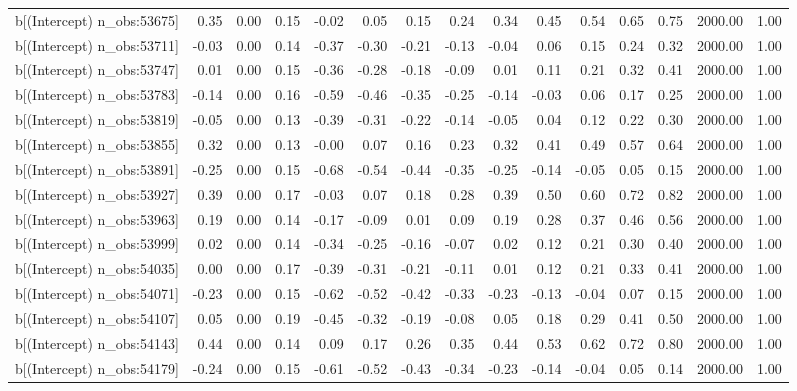 \begin{table}[ht]
\begin{tabular}{rrrrrrrrrrrrrrr}
  b[(Intercept) n\_obs:53675] & 0.35 & 0.00 & 0.15 & -0.02 & 0.05 & 0.15 & 0.24 & 0.34 & 0.45 & 0.54 & 0.65 & 0.75 & 2000.00 & 1.00 \\ 
  b[(Intercept) n\_obs:53711] & -0.03 & 0.00 & 0.14 & -0.37 & -0.30 & -0.21 & -0.13 & -0.04 & 0.06 & 0.15 & 0.24 & 0.32 & 2000.00 & 1.00 \\ 
  b[(Intercept) n\_obs:53747] & 0.01 & 0.00 & 0.15 & -0.36 & -0.28 & -0.18 & -0.09 & 0.01 & 0.11 & 0.21 & 0.32 & 0.41 & 2000.00 & 1.00 \\ 
  b[(Intercept) n\_obs:53783] & -0.14 & 0.00 & 0.16 & -0.59 & -0.46 & -0.35 & -0.25 & -0.14 & -0.03 & 0.06 & 0.17 & 0.25 & 2000.00 & 1.00 \\ 
  b[(Intercept) n\_obs:53819] & -0.05 & 0.00 & 0.13 & -0.39 & -0.31 & -0.22 & -0.14 & -0.05 & 0.04 & 0.12 & 0.22 & 0.30 & 2000.00 & 1.00 \\ 
  b[(Intercept) n\_obs:53855] & 0.32 & 0.00 & 0.13 & -0.00 & 0.07 & 0.16 & 0.23 & 0.32 & 0.41 & 0.49 & 0.57 & 0.64 & 2000.00 & 1.00 \\ 
  b[(Intercept) n\_obs:53891] & -0.25 & 0.00 & 0.15 & -0.68 & -0.54 & -0.44 & -0.35 & -0.25 & -0.14 & -0.05 & 0.05 & 0.15 & 2000.00 & 1.00 \\ 
  b[(Intercept) n\_obs:53927] & 0.39 & 0.00 & 0.17 & -0.03 & 0.07 & 0.18 & 0.28 & 0.39 & 0.50 & 0.60 & 0.72 & 0.82 & 2000.00 & 1.00 \\ 
  b[(Intercept) n\_obs:53963] & 0.19 & 0.00 & 0.14 & -0.17 & -0.09 & 0.01 & 0.09 & 0.19 & 0.28 & 0.37 & 0.46 & 0.56 & 2000.00 & 1.00 \\ 
  b[(Intercept) n\_obs:53999] & 0.02 & 0.00 & 0.14 & -0.34 & -0.25 & -0.16 & -0.07 & 0.02 & 0.12 & 0.21 & 0.30 & 0.40 & 2000.00 & 1.00 \\ 
  b[(Intercept) n\_obs:54035] & 0.00 & 0.00 & 0.17 & -0.39 & -0.31 & -0.21 & -0.11 & 0.01 & 0.12 & 0.21 & 0.33 & 0.41 & 2000.00 & 1.00 \\ 
  b[(Intercept) n\_obs:54071] & -0.23 & 0.00 & 0.15 & -0.62 & -0.52 & -0.42 & -0.33 & -0.23 & -0.13 & -0.04 & 0.07 & 0.15 & 2000.00 & 1.00 \\ 
  b[(Intercept) n\_obs:54107] & 0.05 & 0.00 & 0.19 & -0.45 & -0.32 & -0.19 & -0.08 & 0.05 & 0.18 & 0.29 & 0.41 & 0.50 & 2000.00 & 1.00 \\ 
  b[(Intercept) n\_obs:54143] & 0.44 & 0.00 & 0.14 & 0.09 & 0.17 & 0.26 & 0.35 & 0.44 & 0.53 & 0.62 & 0.72 & 0.80 & 2000.00 & 1.00 \\ 
  b[(Intercept) n\_obs:54179] & -0.24 & 0.00 & 0.15 & -0.61 & -0.52 & -0.43 & -0.34 & -0.23 & -0.14 & -0.04 & 0.05 & 0.14 & 2000.00 & 1.00 \\ 

\end{tabular}
\end{table}
